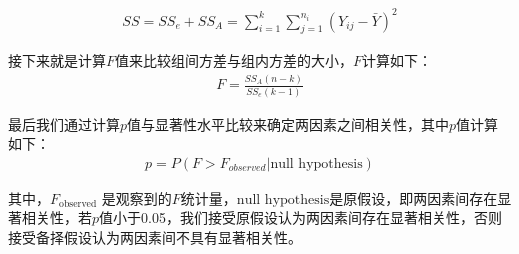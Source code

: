 \documentclass[withoutpreface,bwprint]{cumcmthesis} %
\begin{document}
\begin{eqnarray}
SS=SS_e+SS_A=\sum_{i=1}^k\sum_{j=1}^{n_i}(Y_{ij}-\bar{Y})^2
\end{eqnarray}

接下来就是计算$F$值来比较组间方差与组内方差的大小，$F$计算如下：
\begin{eqnarray}
F=\frac{SS_A(n-k)}{SS_e(k-1)}
\end{eqnarray}

最后我们通过计算$p$值与显著性水平比较来确定两因素之间相关性，其中$p$值计算如下：
\begin{eqnarray}
p=P(F>F_{observed}|\text{null hypothesis})
\end{eqnarray}

其中，$F_{\text{observed}}$ 是观察到的$F$统计量，$\text{null hypothesis}$是原假设，即两因素间存在显著相关性，若$p$值小于0.05，我们接受原假设认为两因素间存在显著相关性，否则接受备择假设认为两因素间不具有显著相关性。
\end{document}
